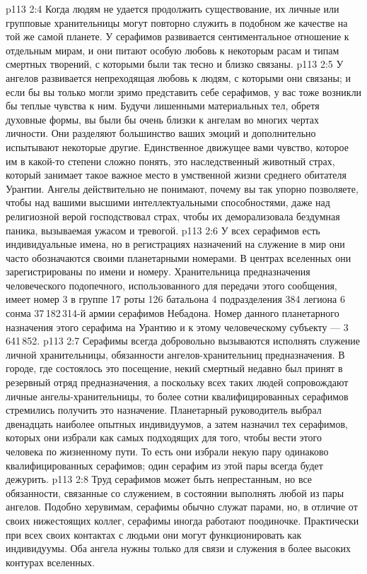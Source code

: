 \vs p113 2:4 \pc Когда людям не удается продолжить существование, их личные или групповые хранительницы могут повторно служить в подобном же качестве на той же самой планете. У серафимов развивается сентиментальное отношение к отдельным мирам, и они питают особую любовь к некоторым расам и типам смертных творений, с которыми были так тесно и близко связаны.
\vs p113 2:5 У ангелов развивается непреходящая любовь к людям, с которыми они связаны; и если бы вы только могли зримо представить себе серафимов, у вас тоже возникли бы теплые чувства к ним. Будучи лишенными материальных тел, обретя духовные формы, вы были бы очень близки к ангелам во многих чертах личности. Они разделяют большинство ваших эмоций и дополнительно испытывают некоторые другие. Единственное движущее вами чувство, которое им в какой\hyp{}то степени сложно понять, это наследственный животный страх, который занимает такое важное место в умственной жизни среднего обитателя Урантии. Ангелы действительно не понимают, почему вы так упорно позволяете, чтобы над вашими высшими интеллектуальными способностями, даже над религиозной верой господствовал страх, чтобы их деморализовала бездумная паника, вызываемая ужасом и тревогой.
\vs p113 2:6 \pc У всех серафимов есть индивидуальные имена, но в регистрациях назначений на служение в мир они часто обозначаются своими планетарными номерами. В центрах вселенных они зарегистрированы по имени и номеру. Хранительница предназначения человеческого подопечного, использованного для передачи этого сообщения, имеет номер 3 в группе 17 роты 126 батальона 4 подразделения 384 легиона 6 сонма 37\,182\,314\hyp{}й армии серафимов Небадона. Номер данного планетарного назначения этого серафима на Урантию и к этому человеческому субъекту --- 3\,641\,852.
\vs p113 2:7 \pc Серафимы всегда добровольно вызываются исполнять служение личной хранительницы, обязанности ангелов\hyp{}хранительниц предназначения. В городе, где состоялось это посещение, некий смертный недавно был принят в резервный отряд предназначения, а поскольку всех таких людей сопровождают личные ангелы\hyp{}хранительницы, то более сотни квалифицированных серафимов стремились получить это назначение. Планетарный руководитель выбрал двенадцать наиболее опытных индивидуумов, а затем назначил тех серафимов, которых они избрали как самых подходящих для того, чтобы вести этого человека по жизненному пути. То есть они избрали некую пару одинаково квалифицированных серафимов; один серафим из этой пары всегда будет дежурить.
\vs p113 2:8 Труд серафимов может быть непрестанным, но все обязанности, связанные со служением, в состоянии выполнять любой из пары ангелов. Подобно херувимам, серафимы обычно служат парами, но, в отличие от своих нижестоящих коллег, серафимы иногда работают поодиночке. Практически при всех своих контактах с людьми они могут функционировать как индивидуумы. Оба ангела нужны только для связи и служения в более высоких контурах вселенных.
